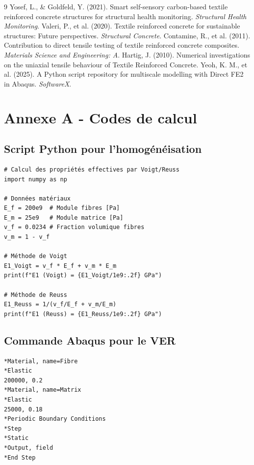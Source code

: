 \documentclass{rapportECL}
\begin{document}

\begin{thebibliography}{9}
 Yosef, L., \& Goldfeld, Y. (2021). Smart self-sensory carbon-based textile reinforced concrete structures for structural health monitoring. \textit{Structural Health Monitoring}.
 Valeri, P., et al. (2020). Textile reinforced concrete for sustainable structures: Future perspectives. \textit{Structural Concrete}.
 Contamine, R., et al. (2011). Contribution to direct tensile testing of textile reinforced concrete composites. \textit{Materials Science and Engineering: A}.
 Hartig, J. (2010). Numerical investigations on the uniaxial tensile behaviour of Textile Reinforced Concrete.
 Yeoh, K. M., et al. (2025). A Python script repository for multiscale modelling with Direct FE2 in Abaqus. \textit{SoftwareX}.
\end{thebibliography}

\appendix
\section{Annexe A - Codes de calcul}

\subsection{Script Python pour l'homogénéisation}

\begin{verbatim}
# Calcul des propriétés effectives par Voigt/Reuss
import numpy as np

# Données matériaux
E_f = 200e9  # Module fibres [Pa]
E_m = 25e9   # Module matrice [Pa]
v_f = 0.0234 # Fraction volumique fibres
v_m = 1 - v_f

# Méthode de Voigt
E1_Voigt = v_f * E_f + v_m * E_m
print(f"E1 (Voigt) = {E1_Voigt/1e9:.2f} GPa")

# Méthode de Reuss
E1_Reuss = 1/(v_f/E_f + v_m/E_m)
print(f"E1 (Reuss) = {E1_Reuss/1e9:.2f} GPa")
\end{verbatim}

\subsection{Commande Abaqus pour le VER}

\begin{verbatim}
*Material, name=Fibre
*Elastic
200000, 0.2
*Material, name=Matrix
*Elastic
25000, 0.18
*Periodic Boundary Conditions
*Step
*Static
*Output, field
*End Step
\end{verbatim}
\end{document}
